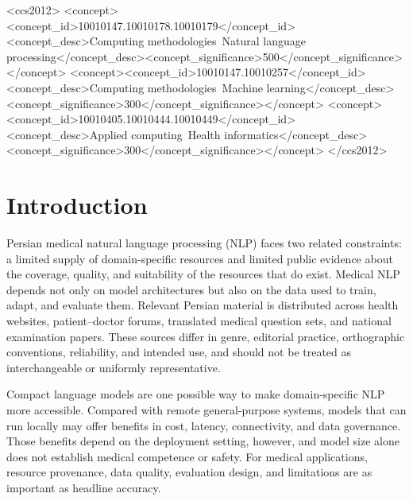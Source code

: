 \documentclass[manuscript,screen,review]{acmart}
\begin{document}
\begin{CCSXML}
<ccs2012>
 <concept><concept_id>10010147.10010178.10010179</concept_id><concept_desc>Computing methodologies~Natural language processing</concept_desc><concept_significance>500</concept_significance></concept>
 <concept><concept_id>10010147.10010257</concept_id><concept_desc>Computing methodologies~Machine learning</concept_desc><concept_significance>300</concept_significance></concept>
 <concept><concept_id>10010405.10010444.10010449</concept_id><concept_desc>Applied computing~Health informatics</concept_desc><concept_significance>300</concept_significance></concept>
</ccs2012>
\end{CCSXML}
\maketitle

\section{Introduction}\label{sec1}

Persian medical natural language processing (NLP) faces two related constraints: a limited supply of domain-specific resources and limited public evidence about the coverage, quality, and suitability of the resources that do exist. Medical NLP depends not only on model architectures but also on the data used to train, adapt, and evaluate them. Relevant Persian material is distributed across health websites, patient--doctor forums, translated medical question sets, and national examination papers. These sources differ in genre, editorial practice, orthographic conventions, reliability, and intended use, and should not be treated as interchangeable or uniformly representative.

Compact language models are one possible way to make domain-specific NLP more accessible. Compared with remote general-purpose systems, models that can run locally may offer benefits in cost, latency, connectivity, and data governance. Those benefits depend on the deployment setting, however, and model size alone does not establish medical competence or safety. For medical applications, resource provenance, data quality, evaluation design, and limitations are as important as headline accuracy.
\end{document}
